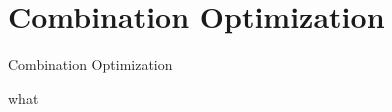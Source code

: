\section{Combination Optimization}

    \frame{\sectionpage}

    \begin{frame}{Combination Optimization}

    \end{frame}

    \begin{frame}{what}
   \end{frame}
